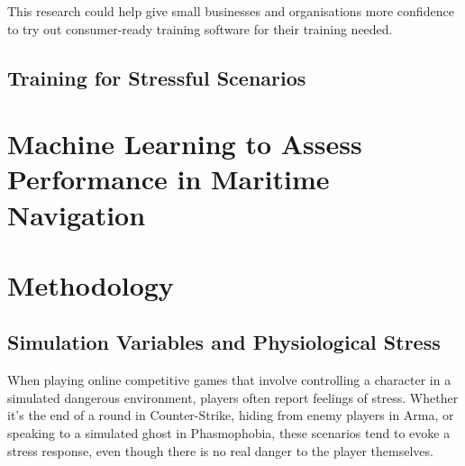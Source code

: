 \documentclass[12pt]{article}
\begin{document}
This research could help give small businesses and organisations more confidence to try out consumer-ready training software for their training needed. 



\subsection{Training for Stressful Scenarios}

\section{Machine Learning to Assess Performance in Maritime Navigation}



\section{Methodology}

\subsection{Simulation Variables and Physiological Stress}

When playing online competitive games that involve controlling a character in a simulated dangerous environment, players often report feelings of stress. Whether it's the end of a round in Counter-Strike, hiding from enemy players in Arma, or speaking to a simulated ghost in Phasmophobia, these scenarios tend to evoke a stress response, even though there is no real danger to the player themselves.
\end{document}
